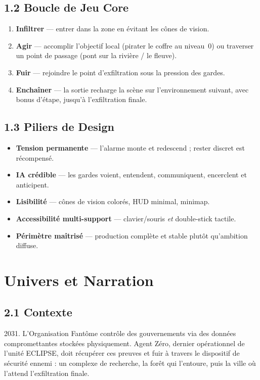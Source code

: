 \documentclass[11pt,a4paper]{article}
\begin{document}
\subsection{1.2 Boucle de Jeu Core}
\begin{enumerate}[leftmargin=*]
  \item \textbf{Infiltrer} --- entrer dans la zone en \'evitant les c\^ones de vision.
  \item \textbf{Agir} --- accomplir l'objectif local (pirater le coffre au niveau~0)
        ou traverser un point de passage (pont sur la rivi\`ere / le fleuve).
  \item \textbf{Fuir} --- rejoindre le point d'exfiltration sous la pression des gardes.
  \item \textbf{Encha\^iner} --- la sortie recharge la sc\`ene sur l'environnement suivant,
        avec bonus d'\'etape, jusqu'\`a l'exfiltration finale.
\end{enumerate}

\subsection{1.3 Piliers de Design}
\begin{itemize}[leftmargin=*]
  \item \textbf{Tension permanente} --- l'alarme monte et redescend ; rester discret est r\'ecompens\'e.
  \item \textbf{IA cr\'edible} --- les gardes voient, entendent, communiquent, encerclent et anticipent.
  \item \textbf{Lisibilit\'e} --- c\^ones de vision color\'es, HUD minimal, minimap.
  \item \textbf{Accessibilit\'e multi-support} --- clavier/souris \emph{et} double-stick tactile.
  \item \textbf{P\'erim\`etre ma\^itris\'e} --- production compl\`ete et stable plut\^ot qu'ambition diffuse.
\end{itemize}

\section{Univers et Narration}

\subsection{2.1 Contexte}
2031. L'Organisation Fant\^ome contr\^ole des gouvernements via des donn\'ees
compromettantes stock\'ees physiquement. Agent Z\'ero, dernier op\'erationnel de
l'unit\'e ECLIPSE, doit r\'ecup\'erer ces preuves et fuir \`a travers le dispositif
de s\'ecurit\'e ennemi : un complexe de recherche, la for\^et qui l'entoure, puis
la ville o\`u l'attend l'exfiltration finale.
\end{document}
